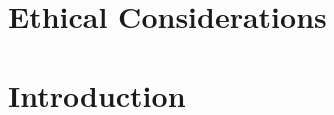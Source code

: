 \documentclass[12pt]{article}
\begin{document}
\pagebreak

\section*{Ethical Considerations}


\pagebreak

\tableofcontents

\pagebreak


\section{Introduction}


\end{document}

